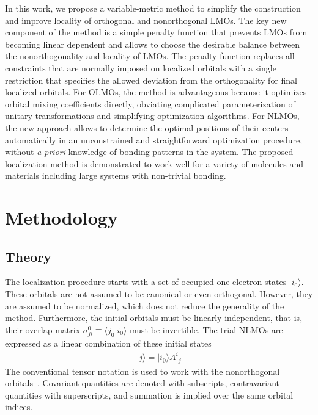 \documentclass[aps,prl,reprint,amsmath,amssymb]{revtex4-1}
\newcommand{\ket}[1]{\ensuremath{\vert #1 \rangle}}
\newcommand{\braket}[2]{\ensuremath{\langle #1 \vert #2 \rangle}} %
\begin{document}
In this work, we propose a variable-metric method to simplify the construction and improve locality of orthogonal and nonorthogonal LMOs. 
The key new component of the method is a simple penalty function that prevents LMOs from becoming linear dependent and allows to choose the desirable balance between the nonorthogonality and locality of LMOs. 
The penalty function replaces all constraints that are normally imposed on localized orbitals with a single restriction that specifies the allowed deviation from the orthogonality for final localized orbitals. 
For \mbox{OLMOs}, the method is advantageous because it optimizes orbital mixing coefficients directly, obviating complicated parameterization of unitary transformations and simplifying optimization algorithms.  
For \mbox{NLMOs}, the new approach allows to determine the optimal positions of their centers automatically in an unconstrained and straightforward optimization procedure, without \emph{a priori} knowledge of bonding patterns in the system.
The proposed localization method is demonstrated to work well for a variety of molecules and materials including large systems with non-trivial bonding. 


\section{Methodology}

\subsection{Theory}

The localization procedure starts with a set of occupied one-electron states $\ket{i_0}$. 
These orbitals are not assumed to be canonical or even orthogonal. 
However, they are assumed to be normalized, which does not reduce the generality of the method. 
Furthermore, the initial orbitals must be linearly independent, that is, their overlap matrix $\sigma_{ji}^0 \equiv \braket{j_0}{i_0}$ must be invertible. 
The trial NLMOs are expressed as a linear combination of these initial states
%
\begin{equation}
\begin{split}
\ket{j} = \ket{i_0} {A^i}_j  
\end{split}
\end{equation}
%
The conventional tensor notation is used to work with the nonorthogonal orbitals~\cite{head1998tensor}. Covariant quantities are denoted with subscripts, contravariant quantities with superscripts, and summation is implied over the same orbital indices.
\end{document}

